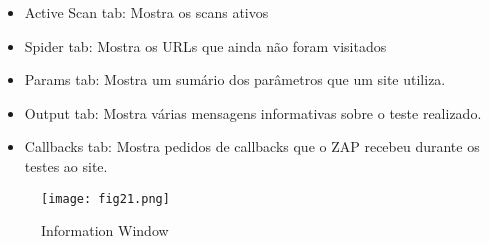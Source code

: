 \begin{enumerate}
\begin{itemize}
	\item Active Scan tab: Mostra os scans ativos 

	\item Spider tab: Mostra os URLs que ainda não foram visitados

	\item Params tab: Mostra um sumário dos parâmetros que um site utiliza.

	\item Output tab: Mostra várias mensagens informativas sobre o teste realizado.

	\item Callbacks tab: Mostra pedidos de callbacks que o ZAP recebeu durante os testes ao site.

\end{itemize}
\begin{figure}[H]

  \centering

  \texttt{[image: fig21.png]}

  \caption{Information Window}

\end{figure}
\end{enumerate}
